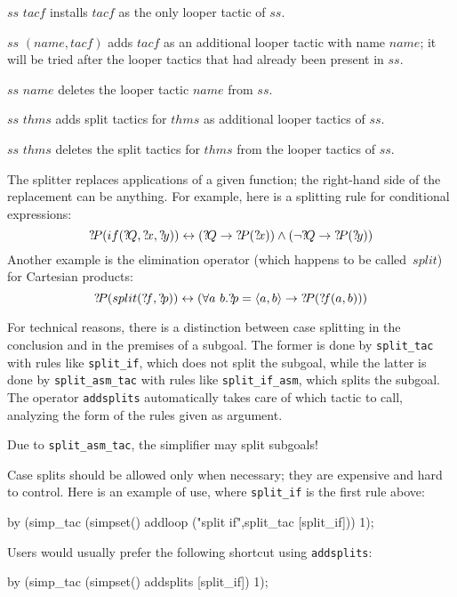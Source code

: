 \begin{ttdescription}
  
\item[$ss$ \ttindexbold{setloop} $tacf$] installs $tacf$ as the only looper
  tactic of $ss$.
  
\item[$ss$ \ttindexbold{addloop} $(name,tacf)$] adds $tacf$ as an additional
  looper tactic with name $name$; it will be tried after the looper tactics
  that had already been present in $ss$.
  
\item[$ss$ \ttindexbold{delloop} $name$] deletes the looper tactic $name$
  from $ss$.
  
\item[$ss$ \ttindexbold{addsplits} $thms$] adds
  split tactics for $thms$ as additional looper tactics of $ss$.

\item[$ss$ \ttindexbold{addsplits} $thms$] deletes the
  split tactics for $thms$ from the looper tactics of $ss$.

\end{ttdescription}

The splitter replaces applications of a given function; the right-hand side
of the replacement can be anything.  For example, here is a splitting rule
for conditional expressions:
\[ \Var{P}(if(\Var{Q},\Var{x},\Var{y})) \bimp (\Var{Q} \imp \Var{P}(\Var{x}))
\conj (\lnot\Var{Q} \imp \Var{P}(\Var{y})) 
\] 
Another example is the elimination operator (which happens to be
called~$split$) for Cartesian products:
\[ {?\!P}(split({?\!f},{?\!p})) \leftrightarrow (\forall a~b. {?\!p} =
\langle a,b\rangle \rightarrow {?\!P}({?\!f}(a,b))) 
\] 

For technical reasons, there is a distinction between case splitting in the 
conclusion and in the premises of a subgoal. The former is done by
\texttt{split_tac} with rules like \texttt{split_if}, 
which does not split the subgoal, while the latter is done by 
\texttt{split_asm_tac} with rules like \texttt{split_if_asm}, 
which splits the subgoal.
The operator \texttt{addsplits} automatically takes care of which tactic to
call, analyzing the form of the rules given as argument.
\begin{warn}
Due to \texttt{split_asm_tac}, the simplifier may split subgoals!
\end{warn}

Case splits should be allowed only when necessary; they are expensive
and hard to control.  Here is an example of use, where \texttt{split_if}
is the first rule above:
\begin{ttbox}
by (simp_tac (simpset() addloop ("split if",split_tac [split_if])) 1);
\end{ttbox}
Users would usually prefer the following shortcut using \texttt{addsplits}:
\begin{ttbox}
by (simp_tac (simpset() addsplits [split_if]) 1);
\end{ttbox}


